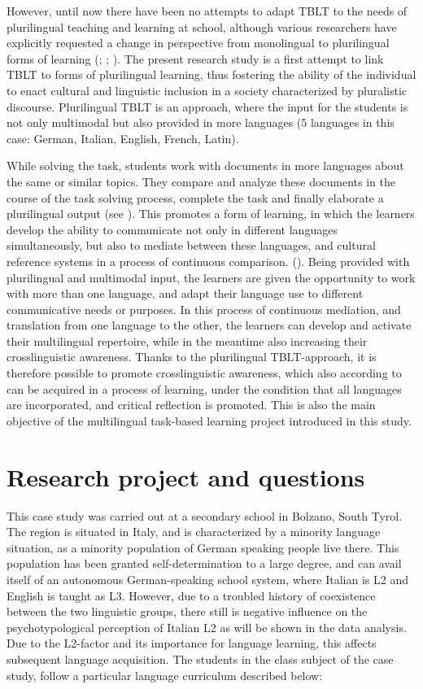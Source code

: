 \documentclass[output=paper]{../langscibook}
\begin{document}
However, until now there have been no attempts to adapt TBLT to the needs of plurilingual teaching and learning at school, although various researchers have explicitly requested a change in perspective from monolingual to plurilingual forms of learning (\citealt{Kramsch2009}; \citealt{Hallet2015}; \citealt{MartinezSchroder-Sura2003}). The present research study is a first attempt to link TBLT to forms of plurilingual learning, thus fostering the ability of the individual to enact cultural and linguistic inclusion in a society characterized by pluralistic discourse. Plurilingual TBLT is an approach, where the input for the students is not only multimodal but also provided in more languages (5 languages in this case: German, Italian, English, French, Latin). 

While solving the task, students work with documents in more languages about the same or similar topics. They compare and analyze these documents in the course of the task solving process, complete the task and finally elaborate a plurilingual output (see \citealt{Mayr2020}). This promotes a form of learning, in which the learners develop the ability to communicate not only in different languages simultaneously, but also to mediate between these languages, and cultural reference systems in a process of continuous comparison. (\citealt[88]{MeisnerEtAl2009}). Being provided with plurilingual and multimodal input, the learners are given the opportunity to work with more than one language, and adapt their language use to different communicative needs or purposes. In this process of continuous mediation, and translation from one language to the other, the learners can develop and activate their multilingual repertoire, while in the meantime also increasing their crosslinguistic awareness. Thanks to the plurilingual TBLT-approach, it is therefore possible to promote crosslinguistic awareness, which also according to \citet{Allgauer-HacklJessner2013} can be acquired in a process of learning, under the condition that all languages are incorporated, and critical reflection is promoted. This is also the main objective of the multilingual task-based learning project introduced in this study.

\section{Research project and questions}

This case study was carried out at a secondary school in Bolzano, South Tyrol. The region is situated in Italy, and is characterized by a minority language situation, as a minority population of German speaking people live there. This population has been granted self-determination to a large degree, and can avail itself of an autonomous German-speaking school system, where Italian is L2 and English is taught as L3. However, due to a troubled history of coexistence between the two linguistic groups, there still is negative influence on the psychotypological perception of Italian L2 as will be shown in the data analysis. Due to the L2-factor and its importance for language learning, this affects subsequent language acquisition. The students in the class subject of the case study, follow a particular language curriculum described below:
\end{document}
